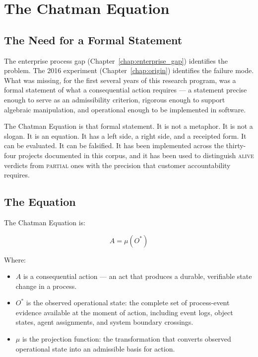 \chapter{The Chatman Equation}
\label{chap:chatman_equation}

\section{The Need for a Formal Statement}

The enterprise process gap (Chapter~\ref{chap:enterprise_gap}) identifies the problem. The 2016 experiment (Chapter~\ref{chap:origin}) identifies the failure mode. What was missing, for the first several years of this research program, was a formal statement of what a consequential action requires --- a statement precise enough to serve as an admissibility criterion, rigorous enough to support algebraic manipulation, and operational enough to be implemented in software.

The Chatman Equation is that formal statement. It is not a metaphor. It is not a slogan. It is an equation. It has a left side, a right side, and a receipted form. It can be evaluated. It can be falsified. It has been implemented across the thirty-four projects documented in this corpus, and it has been used to distinguish \textsc{alive} verdicts from \textsc{partial} ones with the precision that customer accountability requires.

\section{The Equation}

The Chatman Equation is:

\[
A = \mu(O^{*})
\]

Where:

\begin{itemize}
  \item $A$ is a consequential action --- an act that produces a durable, verifiable state change in a process.
  \item $O^{*}$ is the observed operational state: the complete set of process-event evidence available at the moment of action, including event logs, object states, agent assignments, and system boundary crossings.
  \item $\mu$ is the projection function: the transformation that converts observed operational state into an admissible basis for action.
\end{itemize}


